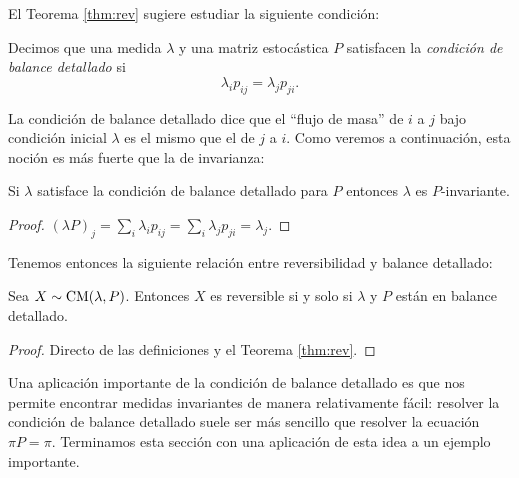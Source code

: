 El Teorema \ref{thm:rev} sugiere estudiar la siguiente condición:

\begin{defn}
Decimos que una medida $\lambda$ y una matriz estocástica $P$ satisfacen la \emph{condición de balance detallado} si
\[\lambda_ip_{ij}=\lambda_jp_{ji}.\]
\end{defn}

La condición de balance detallado dice que el ``flujo de masa'' de $i$ a $j$ bajo condición inicial $\lambda$ es el mismo que el de $j$ a $i$.
Como veremos a continuación, esta noción es más fuerte que la de invarianza:

\begin{prop}
Si $\lambda$ satisface la condición de balance detallado para $P$ entonces $\lambda$ es $P$-invariante.
\end{prop}

\begin{proof}
$(\lambda P)_j=\sum_i\lambda_ip_{ij}=\sum_i\lambda_jp_{ji}=\lambda_j$.
\end{proof}

Tenemos entonces la siguiente relación entre reversibilidad y balance detallado:

\begin{thm}
Sea $X\sim\text{\upshape{CM}}(\lambda,P)$.
Entonces $X$ es reversible si y solo si $\lambda$ y $P$ están en balance detallado.
\end{thm}

\begin{proof}
Directo de las definiciones y el Teorema \ref{thm:rev}.
\end{proof}

Una aplicación importante de la condición de balance detallado es que nos permite encontrar medidas invariantes de manera relativamente fácil: resolver la condición de balance detallado suele ser más sencillo que resolver la ecuación $\pi P=\pi$.
Terminamos esta sección con una aplicación de esta idea a un ejemplo importante.

